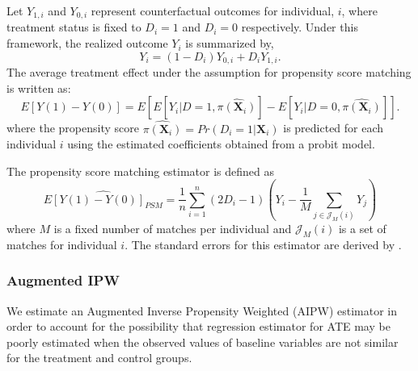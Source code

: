 Let $Y_{1,i}$ and $Y_{0,i}$ represent counterfactual outcomes for individual, $i$, where treatment status is fixed to $D_i=1$ and $D_i=0$ respectively. Under this framework, the realized outcome $Y_i$ is summarized by,
\begin{equation}\label{eq:roy}
Y_i = (1-D_i)Y_{0,i} + D_iY_{1,i}.
\end{equation}
The average treatment effect under the assumption for propensity score matching is written as:
\begin{equation} \label{eq:ATE-PSM}
E[Y(1)-Y(0)] = E[E[Y_i|D=1, \hat{\pi(\boldsymbol{X}_i)}] - E[Y_i|D=0, \hat{\pi(\boldsymbol{X}_i)}]].
\end{equation}
where the propensity score $\hat{\pi({\boldsymbol{X}_i})} = Pr(D_i=1|\boldsymbol{X}_i)$ is predicted for each individual $i$ using the estimated coefficients obtained from a probit model.

The propensity score matching estimator is defined as
\begin{equation} \label{eq:PSM-estimator}
\widehat{E[Y(1)-Y(0)]_{PSM}} = \frac{1}{n} \sum_{i=1}^{n} (2D_i -1)(Y_i - \frac{1}{M}\sum_{j \in \mathcal{J}_M(i)}Y_j )
\end{equation}
where $M$ is a fixed number of matches per individual and $\mathcal{J}_M(i)$ is a set of matches for individual $i$. The standard errors for this estimator are derived by \cite{Abadie_Imbens_2006_Econometrica}.

\subsubsection{Augmented IPW} \label{subsubsection:aipw}

We estimate an Augmented Inverse Propensity Weighted (AIPW) estimator in order to account for the possibility that regression estimator for ATE may be poorly estimated when the observed values of baseline variables are not similar for the treatment and control groups.



